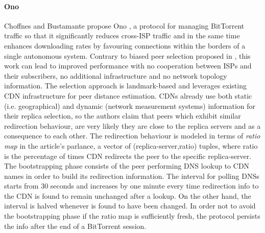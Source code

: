 \paragraph*{\bf Ono}
Choffnes and Bustamante propose Ono \cite{cb_ono_2008}, a protocol for managing
BitTorrent traffic so that it significantly reduces cross-ISP traffic and in
the same time enhances downloading rates by favouring connections within the
borders of a single autonomous system. Contrary to biased peer selection
proposed in \cite{rpc_bitbiased_2006}, this work can lead to improved
performance with no cooperation between ISPs and their subscribers, no
additional infrastructure and no network topology information. The selection
approach is landmark-based and leverages existing CDN infrastructure for peer
distance estimation. CDNs already use both static (i.e. geographical) and
dynamic (network measurement systems) information for their replica selection,
so the authors claim that peers which exhibit similar redirection behaviour, are
very likely they are close to the replica servers and as a consequence to each
other. The redirection behaviour is modeled in terms of \emph{ratio map} in the
article's parlance, a vector of (replica-server,ratio) tuples, where ratio is
the percentage of times CDN redirects the peer to the specific replica-server.
The bootstrapping phase consists of the peer performing DNS lookup to CDN names
in order to build its redirection information. The interval for polling DNSs
starts from 30 seconds and increases by one minute every time redirection info
to the CDN is found to remain unchanged after a lookup. On the other hand, the
interval is halved whenever is found to have been changed. In order not to avoid
the bootstrapping phase if the ratio map is sufficiently fresh, the protocol
persists the info after the end of a BitTorrent session.

